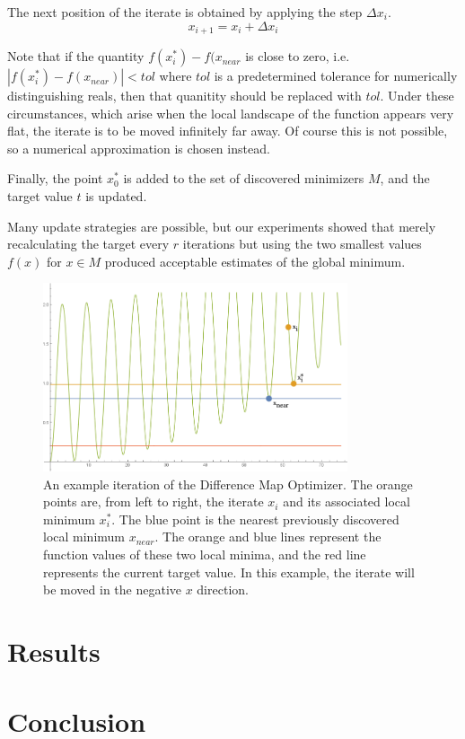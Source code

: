 \documentclass[12pt]{article}
\begin{document}
    The next position of the iterate is obtained by applying the step
    $\Delta x_i$.
    $$
        x_{i+1} = x_i + \Delta x_i
    $$

    Note that if the quantity $f(x_i^*) - f(x_{near}$ is close to zero, i.e.
    $|f(x_i^*) - f(x_{near})| < tol$ where $tol$ is a predetermined tolerance
    for numerically distinguishing reals, then that quanitity should be
    replaced with $tol$. Under these circumstances, which arise when the local
    landscape of the function appears very flat, the iterate is to be moved
    infinitely far away. Of course this is not possible, so a numerical
    approximation is chosen instead.

    Finally, the point $x_0^*$ is added to the set of discovered minimizers
    $M$, and the target value $t$ is updated.

    Many update strategies are possible, but our experiments showed that merely
    recalculating the target every $r$ iterations but using the two smallest
    values $f(x)$ for $x \in M$ produced acceptable estimates of the global
    minimum.

    \begin{figure}
        \begin{center}
            \includegraphics[width=0.8\textwidth]{../figures/iteratingnew.png}
            \caption{An example iteration of the Difference Map Optimizer.
                The orange points are, from left to right, the iterate $x_i$
                and its associated local minimum $x_i^*$. The blue point is the
                nearest previously discovered local minimum $x_{near}$.
                The orange and blue lines represent the function values of
                these two local minima, and the red line represents the current
                target value. In this example, the iterate will be moved in the
                negative $x$ direction.}
        \end{center}
    \end{figure}

\section{Results}

\section{Conclusion}

\pagebreak



\end{document}
